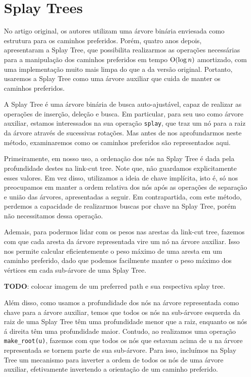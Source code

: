 \section{Splay Trees}
\label{sec:lct-splay-trees}

No artigo original, os autores utilizam uma árvore binária enviesada como estrutura para os caminhos preferidos. Porém, quatro anos depois, ~\citet{10.1145/3828.3835} apresentaram a Splay Tree, que possibilita realizarmos as operações necessárias para a manipulação dos caminhos preferidos em tempo $\mathrm{O}(\log n)$ amortizado, com uma implementação muito mais limpa do que a da versão original. Portanto, usaremos a Splay Tree como uma árvore auxiliar que cuida de manter os caminhos preferidos.

A Splay Tree é uma árvore binária de busca auto-ajustável, capaz de realizar as operações de inserção, deleção e busca. Em particular, para seu uso como árvore auxiliar, estamos interessados na sua operação \texttt{splay}, que traz um nó para a raiz da árvore através de sucessivas rotações. Mas antes de nos aprofundarmos neste método, examinaremos como os caminhos preferidos são representados aqui.

Primeiramente, em nosso uso, a ordenação dos nós na Splay Tree é dada pela profundidade destes na link-cut tree. Note que, não guardamos explicitamente esses valores. Em vez disso, utilizamos a ideia de chave implícita, isto é, só nos preocupamos em manter a ordem relativa dos nós após as operações de separação e união das árvores, apresentadas a seguir. Em contrapartida, com este método, perdemos a capacidade de realizarmos buscas por chave na Splay Tree, porém não necessitamos dessa operação.

Ademais, para podermos lidar com os pesos nas arestas da link-cut tree, fazemos com que cada aresta da árvore representada vire um nó na árvore auxiliar. Isso nos permite calcular eficientemente o peso máximo de uma aresta em um caminho preferido, dado que podemos facilmente manter o peso máximo dos vértices em cada sub-árvore de uma Splay Tree.

\begin{center}
    \textbf{TODO}: colocar imagem de um preferred path e sua respectiva splay tree.
\end{center}

Além disso, como usamos a profundidade dos nós na árvore representada como chave para a árvore auxiliar, temos que todos os nós na sub-árvore esquerda da raiz de uma Splay Tree têm uma profundidade menor que a raiz, enquanto os nós á direita têm uma profundidade maior. Contudo, ao realizamos uma operação \texttt{make\_root(u)}, fazemos com que todos os nós que estavam acima de $u$ na árvore representada se tornem parte de sua sub-árvore. Para isso, incluímos na Splay Tree um mecanismo para inverter a ordem de todos os nós de uma árvore auxiliar, efetivamente invertendo a orientação de um caminho preferido.

